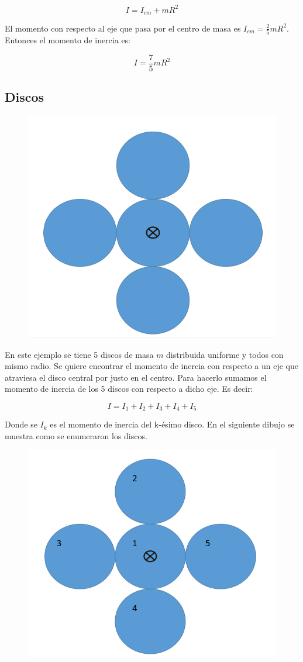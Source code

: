 \documentclass[a4paper,11pt]{article}
\theoremstyle{mytheor}
\begin{document}
$$ I = I_{cm} + m R^2$$

El momento con respecto al eje que pasa por el centro de masa es $I_{cm} =\frac{2}{5} m R^2$. Entonces el momento de inercia es:

$$ I = \frac{7}{5} m R^2$$



\subsection{Discos}




\begin{figure}[h]
	\includegraphics[width=0.4\linewidth]{parelelodiscos}
	\label{fcN4}
\end{figure}


En este ejemplo se tiene 5 discos de masa $m$ distribuida uniforme y todos con mismo radio. Se quiere encontrar el momento de inercia con respecto a un eje que atraviesa el disco central por justo en el centro. Para hacerlo sumamos el momento de inercia de los 5 discos con respecto a dicho eje. Es decir:

$$ I = I_1 + I_2 + I_3 + I_4 + I_5$$

Donde se $I_k$ es el momento de inercia del k-ésimo disco. En el siguiente dibujo se muestra como se enumeraron los discos.
\begin{figure}[h]
	\includegraphics[width=0.6\linewidth]{numerados}
	\label{fcN4}
\end{figure}
\end{document}
